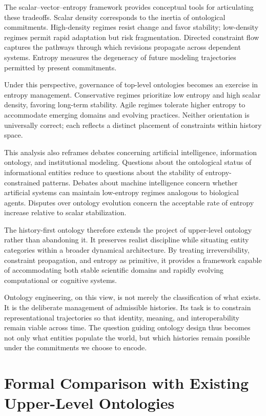 \documentclass[12pt]{article}
\begin{document}
The scalar–vector–entropy framework provides conceptual tools for articulating these tradeoffs. Scalar density corresponds to the inertia of ontological commitments. High-density regimes resist change and favor stability; low-density regimes permit rapid adaptation but risk fragmentation. Directed constraint flow captures the pathways through which revisions propagate across dependent systems. Entropy measures the degeneracy of future modeling trajectories permitted by present commitments.

Under this perspective, governance of top-level ontologies becomes an exercise in entropy management. Conservative regimes prioritize low entropy and high scalar density, favoring long-term stability. Agile regimes tolerate higher entropy to accommodate emerging domains and evolving practices. Neither orientation is universally correct; each reflects a distinct placement of constraints within history space.

This analysis also reframes debates concerning artificial intelligence, information ontology, and institutional modeling. Questions about the ontological status of informational entities reduce to questions about the stability of entropy-constrained patterns. Debates about machine intelligence concern whether artificial systems can maintain low-entropy regimes analogous to biological agents. Disputes over ontology evolution concern the acceptable rate of entropy increase relative to scalar stabilization.

The history-first ontology therefore extends the project of upper-level ontology rather than abandoning it. It preserves realist discipline while situating entity categories within a broader dynamical architecture. By treating irreversibility, constraint propagation, and entropy as primitive, it provides a framework capable of accommodating both stable scientific domains and rapidly evolving computational or cognitive systems.

Ontology engineering, on this view, is not merely the classification of what exists. It is the deliberate management of admissible histories. Its task is to constrain representational trajectories so that identity, meaning, and interoperability remain viable across time. The question guiding ontology design thus becomes not only what entities populate the world, but which histories remain possible under the commitments we choose to encode.

\section{Formal Comparison with Existing Upper-Level Ontologies}
\end{document}
